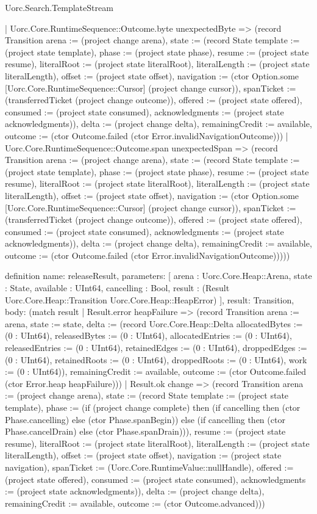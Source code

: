 \begin{lexlean}{Uorc.Search.TemplateStream}
\begin{semanticmodule}
{      | Uorc.Core.RuntimeSequence::Outcome.byte unexpectedByte => (record Transition {arena := (project change arena), state := (record State {template := (project state template), phase := (project state phase), resume := (project state resume), literalRoot := (project state literalRoot), literalLength := (project state literalLength), offset := (project state offset), navigation := (ctor Option.some [Uorc.Core.RuntimeSequence::Cursor] (project change cursor)), spanTicket := (transferredTicket (project change outcome)), offered := (project state offered), consumed := (project state consumed), acknowledgments := (project state acknowledgments)}), delta := (project change delta), remainingCredit := available, outcome := (ctor Outcome.failed (ctor Error.invalidNavigationOutcome))})
      | Uorc.Core.RuntimeSequence::Outcome.span unexpectedSpan => (record Transition {arena := (project change arena), state := (record State {template := (project state template), phase := (project state phase), resume := (project state resume), literalRoot := (project state literalRoot), literalLength := (project state literalLength), offset := (project state offset), navigation := (ctor Option.some [Uorc.Core.RuntimeSequence::Cursor] (project change cursor)), spanTicket := (transferredTicket (project change outcome)), offered := (project state offered), consumed := (project state consumed), acknowledgments := (project state acknowledgments)}), delta := (project change delta), remainingCredit := available, outcome := (ctor Outcome.failed (ctor Error.invalidNavigationOutcome))})))
}

definition{
  name: releaseResult,
  parameters: [
    arena : Uorc.Core.Heap::Arena,
    state : State,
    available : UInt64,
    cancelling : Bool,
    result : (Result Uorc.Core.Heap::Transition Uorc.Core.Heap::HeapError)
  ],
  result: Transition,
  body: (match result
    | Result.error heapFailure => (record Transition {arena := arena, state := state, delta := (record Uorc.Core.Heap::Delta {allocatedBytes := (0 : UInt64), releasedBytes := (0 : UInt64), allocatedEntries := (0 : UInt64), releasedEntries := (0 : UInt64), retainedEdges := (0 : UInt64), droppedEdges := (0 : UInt64), retainedRoots := (0 : UInt64), droppedRoots := (0 : UInt64), work := (0 : UInt64)}), remainingCredit := available, outcome := (ctor Outcome.failed (ctor Error.heap heapFailure))})
    | Result.ok change => (record Transition {arena := (project change arena), state := (record State {template := (project state template), phase := (if (project change complete) then (if cancelling then (ctor Phase.cancelling) else (ctor Phase.spanBegin)) else (if cancelling then (ctor Phase.cancelDrain) else (ctor Phase.spanDrain))), resume := (project state resume), literalRoot := (project state literalRoot), literalLength := (project state literalLength), offset := (project state offset), navigation := (project state navigation), spanTicket := (Uorc.Core.RuntimeValue::nullHandle), offered := (project state offered), consumed := (project state consumed), acknowledgments := (project state acknowledgments)}), delta := (project change delta), remainingCredit := available, outcome := (ctor Outcome.advanced)}))
}


\end{semanticmodule}
\end{lexlean}
